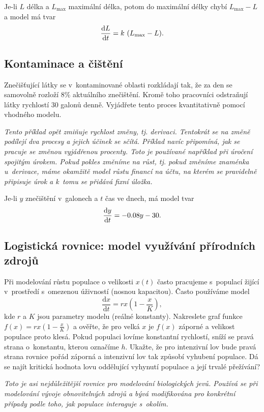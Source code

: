 \reseni
Je-li $L$ délka a $L_{\max}$ maximální délka, potom do maximální délky chybí  $L_{\max}-L$ a model má tvar
$$\derivace Lt=k (L_{\max}-L).$$
\konec

\subsection{Kontaminace a čištění}
Znečišťující látky se v kontaminované oblasti rozkládají tak, že za den se samovolně rozloží 
$8\%$ aktuálního znečištění. Kromě toho pracovníci odstraňují látky rychlostí $30$
galonů denně. Vyjádřete tento proces kvantitativně pomocí vhodného
modelu.

\textit{Tento příklad opět zmiňuje rychlost změny, tj. derivaci. Tentokrát se na změně podílejí dva procesy a jejich účinek se sčítá. Příklad navíc připomíná, jak se pracuje se změnou vyjádřenou procenty. Toto je používané například při úročení spojitým úrokem. Pokud pokles změníme na růst, tj. pokud změníme
  znaménka u derivace, máme okamžitě model růstu financí na účtu, na kterém se pravidelně připisuje úrok a k tomu se přidává fixní úložka.}

\reseni Je-li $y$ znečištění v galonech a $t$ čas ve dnech, má model tvar
$$\frac{\mathrm{d}y}{\mathrm{d}t}=-0.08y-30.$$

\konec



\subsection{Logistická rovnice: model využívání přírodních zdrojů}
Při modelování růstu populace o velikosti $x(t)$ často pracujeme s populací žijící v prostředí s omezenou úživností (nosnou kapacitou). Často používáme model
$$\frac{\mathrm d x}{\mathrm dt}=rx\left(1-\frac xK\right),$$
kde $r$ a $K$ jsou parametry modelu (reálné konstanty).  Nakreslete
graf funkce $f(x)=rx\left(1-\frac xK\right)$ a ověřte, že pro velká
$x$ je $f(x)$ záporné a velikost populace proto klesá. Pokud populaci
lovíme konstantní rychlostí, sníží se pravá strana o konstantu, kterou
označíme $h$. Ukažte, že pro intenzivní lov bude pravá strana rovnice
pořád záporná a intenzivní lov tak způsobí vyhubení populace. Dá se
najít kritická hodnota lovu oddělující vyhynutí populace a její
trvalé přežívání?

\textit{Toto je asi nejdůležitější rovnice pro modelování biologických jevů. Používá se při modelování vývoje obnovitelných zdrojů a bývá modifikována pro konkrétní případy podle toho, jak populace interaguje s okolím.}

